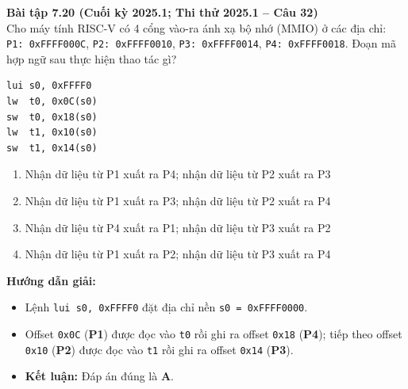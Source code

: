 \textbf{Bài tập 7.20 (Cuối kỳ 2025.1; Thi thử 2025.1 -- Câu 32)}\\
Cho máy tính RISC-V có 4 cổng vào-ra ánh xạ bộ nhớ (MMIO) ở các địa chỉ: \texttt{P1: 0xFFFF000C}, \texttt{P2: 0xFFFF0010}, \texttt{P3: 0xFFFF0014}, \texttt{P4: 0xFFFF0018}. Đoạn mã hợp ngữ sau thực hiện thao tác gì?
\begin{lstlisting}
lui s0, 0xFFFF0
lw  t0, 0x0C(s0)
sw  t0, 0x18(s0)
lw  t1, 0x10(s0)
sw  t1, 0x14(s0)
\end{lstlisting}
\begin{enumerate}[label=\Alph*.]
    \item Nhận dữ liệu từ P1 xuất ra P4; nhận dữ liệu từ P2 xuất ra P3
    \item Nhận dữ liệu từ P1 xuất ra P3; nhận dữ liệu từ P2 xuất ra P4
    \item Nhận dữ liệu từ P4 xuất ra P1; nhận dữ liệu từ P3 xuất ra P2
    \item Nhận dữ liệu từ P1 xuất ra P2; nhận dữ liệu từ P3 xuất ra P4
\end{enumerate}
\textbf{Hướng dẫn giải:}
\begin{itemize}
    \item Lệnh \texttt{lui s0, 0xFFFF0} đặt địa chỉ nền \texttt{s0 = 0xFFFF0000}.
    \item Offset \texttt{0x0C} (\textbf{P1}) được đọc vào \texttt{t0} rồi ghi ra offset \texttt{0x18} (\textbf{P4}); tiếp theo offset \texttt{0x10} (\textbf{P2}) được đọc vào \texttt{t1} rồi ghi ra offset \texttt{0x14} (\textbf{P3}).
    \item \textbf{Kết luận:} Đáp án đúng là \textbf{A}.
\end{itemize}

